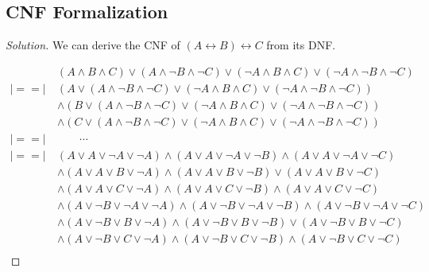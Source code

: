 \documentclass{article}
\newenvironment{solution}{\begin{proof}[\noindent\it Solution]}{\end{proof}}
\begin{document}
\vspace{1em}
\subsection{CNF Formalization}
\vspace{1em}
\begin{solution}
    We can derive the CNF of $\left(A\leftrightarrow B\right)\leftrightarrow C$ from its DNF.

    \vspace{-2.5em}
    \begin{align*}
        & \left(A\land B\land C\right)\lor\left(A\land\neg B\land\neg C\right)\lor\left(\neg A\land B\land C\right)\lor\left(\neg A\land\neg B\land\neg C\right)\\
        |\!\!\!==\!\!\!|\ &\left(A\lor\left(A\land\neg B\land\neg C\right)\lor\left(\neg A\land B\land C\right)\lor\left(\neg A\land\neg B\land\neg C\right)\right)\\
        & \land \left(B\lor\left(A\land\neg B\land\neg C\right)\lor\left(\neg A\land B\land C\right)\lor\left(\neg A\land\neg B\land\neg C\right)\right) \\
        & \land \left(C\lor\left(A\land\neg B\land\neg C\right)\lor\left(\neg A\land B\land C\right)\lor\left(\neg A\land\neg B\land\neg C\right)\right) \\
        |\!\!\!= =\!\!\!|\ & \qquad \cdots \\
        |\!\!\!= =\!\!\!|\ & \left(A\lor A\lor\neg A\lor\neg A\right)\land\left(A\lor A\lor\neg A\lor\neg B\right)\land\left(A\lor A\lor\neg A\lor\neg C\right) \\
        & \land\left(A\lor A\lor B\lor\neg A\right)\land\left(A\lor A\lor B\lor\neg B\right)
        \lor\left(A\lor A\lor B\lor\neg C\right) \\
        & \land\left(A\lor A\lor C\lor\neg A\right)\land\left(A\lor A\lor C\lor\neg B\right)\land\left(A\lor A\lor C\lor\neg C\right) \\
        & \land\left(A\lor\neg B\lor\neg A\lor\neg A\right)\land\left(A\lor\neg B\lor\neg A\lor\neg B\right)\land\left(A\lor\neg B\lor\neg A\lor\neg C\right) \\
        & \land\left(A\lor\neg B\lor B\lor\neg A\right)\land\left(A\lor\neg B\lor B\lor\neg B\right)
        \lor\left(A\lor\neg B\lor B\lor\neg C\right) \\
        & \land\left(A\lor\neg B\lor C\lor\neg A\right)\land\left(A\lor\neg B\lor C\lor\neg B\right)\land\left(A\lor\neg B\lor C\lor\neg C\right) \\

\end{align*}
\end{solution}
\end{document}
